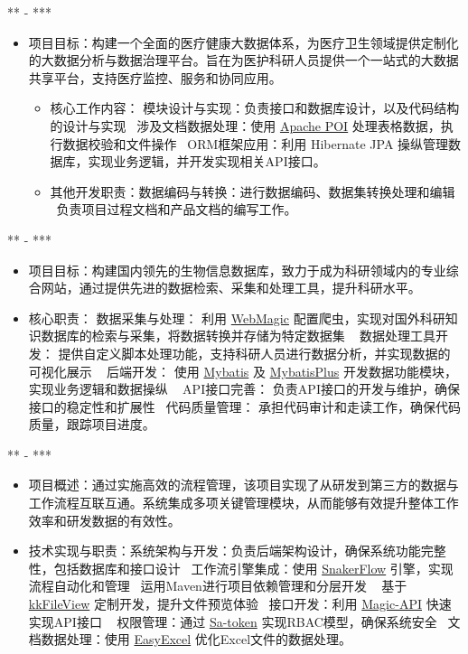 \documentclass[11pt,a4paper]{article}
\newcommand{\daterange}[1]{\hfill{\sffamily\color{graytext}\small#1}}
\newcommand{\project}[1]{{\sffamily\textbf{\cjkit { \textit {\itshape#1}}}}}
\newcommand{\separator}{\textbullet~}  %
\begin{document}
\project{XXX系统}
\daterange{*** - ***}
\begin{itemize}
    \item 项目目标：构建一个全面的医疗健康大数据体系，为医疗卫生领域提供定制化的大数据分析与数据治理平台。旨在为医护科研人员提供一个一站式的大数据共享平台，支持医疗监控、服务和协同应用。
        \begin{itemize}
            \item 核心工作内容： 模块设计与实现：负责接口和数据库设计，以及代码结构的设计与实现 \separator 涉及文档数据处理：使用 \href{https://poi.apache.org/}{Apache POI} 处理表格数据，执行数据校验和文件操作 \separator ORM框架应用：利用 Hibernate JPA 操纵管理数据库，实现业务逻辑，并开发实现相关API接口。
            \item 其他开发职责：数据编码与转换：进行数据编码、数据集转换处理和编辑 \separator 负责项目过程文档和产品文档的编写工作。
        \end{itemize}
\end{itemize}

\project{XXX系统}
\daterange{*** - ***}
\begin{itemize}
    \item 项目目标：构建国内领先的生物信息数据库，致力于成为科研领域内的专业综合网站，通过提供先进的数据检索、采集和处理工具，提升科研水平。
    \item 核心职责： 数据采集与处理： 利用 \href{https://webmagic.io/}{WebMagic} 配置爬虫，实现对国外科研知识数据库的检索与采集，将数据转换并存储为特定数据集 \separator 
            数据处理工具开发： 提供自定义脚本处理功能，支持科研人员进行数据分析，并实现数据的可视化展示 \separator 
            后端开发： 使用 \href{https://mybatis.org/mybatis-3/zh/index.html}{Mybatis} 及 \href{https://mybatis.plus/}{MybatisPlus} 开发数据功能模块，实现业务逻辑和数据操纵 \separator 
            API接口完善： 负责API接口的开发与维护，确保接口的稳定性和扩展性 \separator 代码质量管理： 承担代码审计和走读工作，确保代码质量，跟踪项目进度。
\end{itemize}

\project{XXX系统}
\daterange{*** - ***}
\begin{itemize}
    \item 项目概述：通过实施高效的流程管理，该项目实现了从研发到第三方的数据与工作流程互联互通。系统集成多项关键管理模块，从而能够有效提升整体工作效率和研发数据的有效性。
    \item 技术实现与职责：系统架构与开发：负责后端架构设计，确保系统功能完整性，包括数据库和接口设计 \separator 工作流引擎集成：使用  \href{https://github.com/snakerflow-starter/snakerflow-spring-boot-starter}{SnakerFlow} 引擎，实现流程自动化和管理 \separator 运用Maven进行项目依赖管理和分层开发 \separator
        基于\href{https://kkview.cn/zh-cn/index.html}{kkFileView} 定制开发，提升文件预览体验 \separator 接口开发：利用 \href{https://www.ssssssss.org/magic-api/}{Magic-API} 快速实现API接口 \separator
        权限管理：通过 \href{https://sa-token.cc/}{Sa-token} 实现RBAC模型，确保系统安全 \separator 文档数据处理：使用 \href{https://easyexcel.opensource.alibaba.com/}{EasyExcel} 优化Excel文件的数据处理。

\end{itemize}
   
\end{document}
